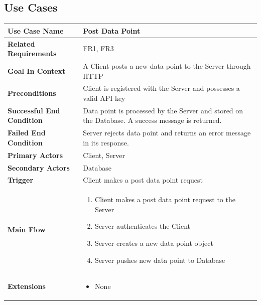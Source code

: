 \documentclass[titlepage]{article}
\newcommand{\longUseCase}[3]
{
    \def\tempMainFlow{#1}%
    \def\tempExtension{#2}%
    \usecase#3
}
\newcommand{\usecase}[9]
{
    \begin{table}[H]
        \centering
        \begin{tabularx}{\textwidth}{|X | X|}
        \hline
            \textbf{Use Case Name} & #1\\
        \hline
            \textbf{Related Requirements} & #2\\
        \hline
            \textbf{Goal In Context} & #3\\
        \hline
            \textbf{Preconditions} & #4\\
        \hline
            \textbf{Successful End Condition} & #5\\
        \hline
            \textbf{Failed End Condition} & #6\\
        \hline
            \textbf{Primary Actors} & #7\\
        \hline
            \textbf{Secondary Actors} & #8\\
        \hline
            \textbf{Trigger} & #9\\
        \hline
            \textbf{Main Flow} & \tempMainFlow\\
        \hline
            \textbf{Extensions} & \tempExtension\\
        \hline
        \end{tabularx}
    \end{table}
    
}
\begin{document}
\subsection{Use Cases}
\longUseCase
{
\begin{enumerate}
    \item Client makes a post data point request to the Server
    \item Server authenticates the Client
    \item Server creates a new data point object
    \item Server pushes new data point to Database
\end{enumerate}
}
{
\begin{itemize}
    \item None
\end{itemize}
}
{
{Post Data Point}
{FR1, FR3}
{A Client posts a new data point to the Server through HTTP}
{Client is registered with the Server and possesses a valid API key}
{Data point is processed by the Server and stored on the Database. A success message is returned.}
{Server rejects data point and returns an error message in its response.}
{Client, Server}
{Database}
{Client makes a post data point request}
}
\end{document}
